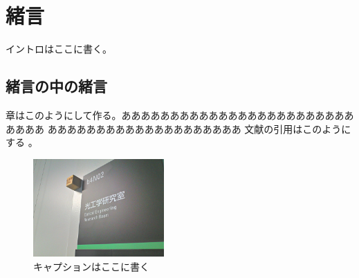 \chapter{緒言}
イントロはここに書く。

\section{緒言の中の緒言}
章はこのようにして作る。ああああああああああああああああああああああああああああ
ああああああああああああああああああああ
文献の引用はこのようにする \cite{Fujii2014}。

\begin{figure}[h!]
\centering
\includegraphics[width=5cm]{figs/hikari_kogaku.jpg}
\caption{
\label{fig:hikari_kogaku_logo}
キャプションはここに書く
}
\end{figure}

